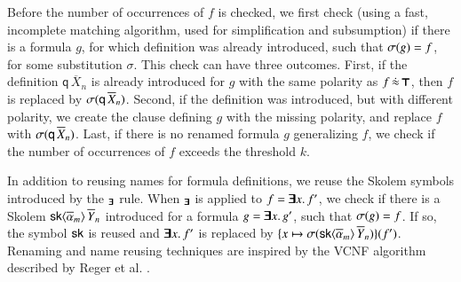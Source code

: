 Before the number of occurrences of $f$ is checked, we first check (using a
fast, incomplete matching algorithm, used for simplification and subsumption) if there is a
formula $g$, for which definition was already introduced, such that
$\sigma(g) = f$, for some substitution $\sigma$. This check can have three
outcomes. First, if the definition $\textsf{q} \, \overline{X}_n$ is already
introduced for $g$ with the same polarity as $f \, \dot{\approx} \,
\pmb{\top}$, then $f$ is replaced by $\sigma(\mathsf{q} \, \overline{X}_{n})$. Second, if
the definition was introduced, but with different polarity, we create the clause
defining $g$ with the missing polarity, and replace $f$ with $\sigma(\mathsf{q}
\, \overline{X}_{n})$. Last, if there is no renamed formula $g$ generalizing $f$,
we check if the number of occurrences of $f$ exceeds the threshold $k$.

In addition to reusing names for formula definitions, we reuse the Skolem
symbols introduced by the $_{\pmb{\exists}}$ rule. When
$_{\pmb{\exists}}$ is applied to $f = \pmb{\exists} x.\, f'$, we check if there is
a Skolem $\mathsf{sk}{\langle\overline{\alpha}_{m}\rangle} \, \overline{Y}_{n}$ introduced for a
formula $g = \pmb{\exists} x.\, g'$, such that $\sigma(g) = f$. If so, the symbol
$\mathsf{sk}$ is reused and $\pmb{\exists} x.\, f'$ is replaced by $\{x \mapsto
\sigma(\mathsf{sk}{\langle\overline{\alpha}_{m}\rangle} \, \overline{Y}_{n}) \}(f')$. Renaming and
name reusing techniques are inspired by the VCNF algorithm described by Reger et
al. \cite{rsv-16-vcnf}.





